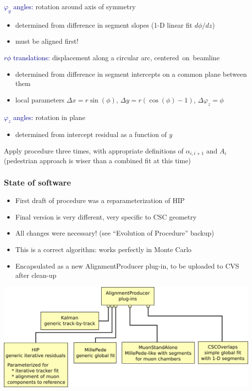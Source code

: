 \documentclass[compress]{beamer}
\begin{document}
\begin{frame}
\textcolor{darkblue}{$\varphi_y$ angles:} rotation around axis of symmetry
\begin{itemize}
\item determined from difference in segment slopes (1-D linear fit $d\phi/dz$)
\item must be aligned first!
\end{itemize}
\textcolor{darkblue}{$r\phi$ translations:} displacement along a circular arc, \mbox{centered on beamline\hspace{-1 cm}}
\begin{itemize}
\item determined from difference in segment intercepts on a common plane between them
\item local parameters $\Delta x = r\sin(\phi)$, $\Delta y = r(\cos(\phi) - 1)$, $\Delta \varphi_z = \phi$
\end{itemize}
\textcolor{darkblue}{$\varphi_z$ angles:} rotation in plane
\begin{itemize}
\item determined from intercept residual as a function of $y$
\end{itemize}

Apply procedure three times, with appropriate definitions of
$\alpha_{i,i+1}$ and $A_i$ (pedestrian approach is wiser than a
combined fit at this time)
\end{frame}

\begin{frame}
\frametitle{State of software}
\small

\begin{itemize}
\item First draft of procedure was a reparameterization of HIP
\item Final version is very different, very specific to CSC geometry
\item All changes were necessary! (see ``Evolution of Procedure'' backup)
\item This is a correct algorithm: works perfectly in Monte Carlo
\item Encapsulated as a new AlignmentProducer plug-in, to be uploaded to CVS after clean-up
\end{itemize}

\includegraphics[width=\linewidth]{software.png}
\end{frame}
\end{document}
